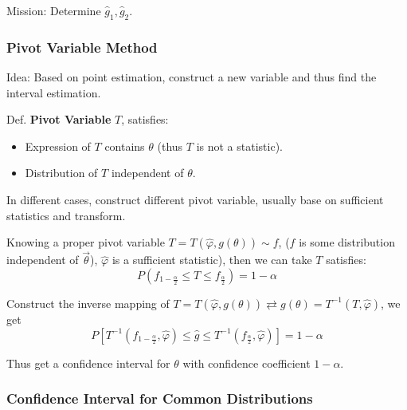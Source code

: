 \documentclass[11pt,a4paper]{ctexart}
\numberwithin{equation}{section}%
\begin{document}
    Mission: Determine $\hat{g}_1,\hat{g}_2$.


\subsubsection{Pivot Variable Method}\label{SubSectionPivotVariableMethod}
    Idea: Based on point estimation, construct a new variable and thus find the interval estimation.

    Def. \textbf{Pivot Variable} $T$, satisfies: 
    \begin{itemize}[itemsep= -2 pt,parsep= -2 pt]
        \item Expression of $T$ contains $\theta$ (thus $T$ is not a statistic).
        \item Distribution of $T$ independent of $\theta$.
    \end{itemize}

    In different cases, construct different pivot variable, usually base on sufficient statistics and transform.
    
    Knowing a proper pivot variable $T=T(\hat{\varphi},g(\theta))\sim f$, ($f$ is some distribution independent of $\vec{\theta}$), $\hat{\varphi}$ is a sufficient statistic), then we can take $T$ satisfies:
    \[
        P(f_{1-\frac{\alpha}{2}}\leq T\leq f_{\frac{\alpha}{2}})=1-\alpha
    \]

    Construct the inverse mapping of $T=T(\hat{\varphi},g(\theta))\rightleftarrows g(\theta)=T^{-1}(T,\hat{\varphi})$, we get
    \[
        P[T^{-1}(f_{1-\frac{\alpha}{2}},\hat{\varphi})\leq\hat{g}\leq T^{-1}(f_{\frac{\alpha}{2}},\hat{\varphi})]=1-\alpha
    \]
    
    Thus get a confidence interval for $\theta$ with confidence coefficient $1-\alpha$.\\



\subsubsection{Confidence Interval for Common Distributions}\label{SubSectionConfidenceIntervalForDistributions}
\end{document}
